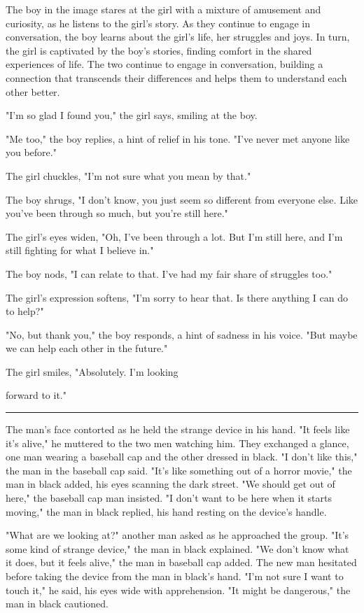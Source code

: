 \documentclass[smalldemyvopaper,11pt,twoside,onecolumn,openright,extrafontsizes]{memoir}
\begin{document}
The boy in the image stares at the girl with a mixture of amusement and curiosity, as he listens to the girl's story. As they continue to engage in conversation, the boy learns about the girl's life, her struggles and joys. In turn, the girl is captivated by the boy's stories, finding comfort in the shared experiences of life. The two continue to engage in conversation, building a connection that transcends their differences and helps them to understand each other better.\par
"I'm so glad I found you," the girl says, smiling at the boy.\par
"Me too," the boy replies, a hint of relief in his tone. "I've never met anyone like you before."\par
The girl chuckles, "I'm not sure what you mean by that."\par
The boy shrugs, "I don't know, you just seem so different from everyone else. Like you've been through so much, but you're still here."\par
The girl's eyes widen, "Oh, I've been through a lot. But I'm still here, and I'm still fighting for what I believe in."\par
The boy nods, "I can relate to that. I've had my fair share of struggles too."\par
The girl's expression softens, "I'm sorry to hear that. Is there anything I can do to help?"\par
"No, but thank you," the boy responds, a hint of sadness in his voice. "But maybe we can help each other in the future."\par
The girl smiles, "Absolutely. I'm looking\par
forward to it."\par
\fancybreak{* * *}
The man's face contorted as he held the strange device in his hand. "It feels like it's alive," he muttered to the two men watching him. They exchanged a glance, one man wearing a baseball cap and the other dressed in black. "I don't like this," the man in the baseball cap said. "It's like something out of a horror movie," the man in black added, his eyes scanning the dark street. "We should get out of here," the baseball cap man insisted. "I don't want to be here when it starts moving," the man in black replied, his hand resting on the device's handle.\par
"What are we looking at?" another man asked as he approached the group. "It's some kind of strange device," the man in black explained. "We don't know what it does, but it feels alive," the man in baseball cap added. The new man hesitated before taking the device from the man in black's hand. "I'm not sure I want to touch it," he said, his eyes wide with apprehension. "It might be dangerous," the man in black cautioned.\par
\end{document}
